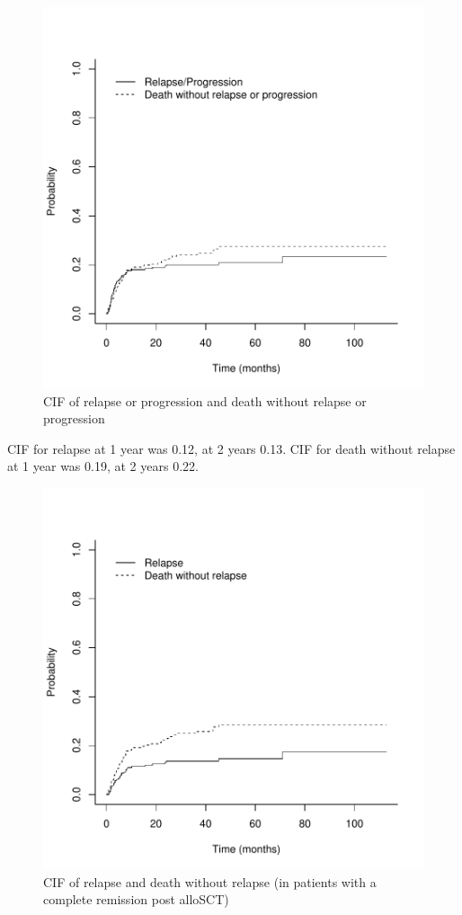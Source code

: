 \documentclass[a4paper,11pt] {article}
\begin{document}
\begin{figure}[h]
\begin{center}
\includegraphics{Rapport-fig6}
\end{center}
\caption{CIF of relapse or progression and death without relapse or progression}
\label{fig6}
\end{figure}

\pagebreak
CIF for relapse at 1 year was 0.12, at 2 years  0.13. CIF for death without relapse  at 1 year was 0.19, at 2 years  0.22. 
\begin{figure}[h]
\begin{center}
\includegraphics{Rapport-fig7}
\end{center}
\caption{CIF of relapse and death without relapse (in patients with a complete remission post alloSCT)}
\label{fig7}
\end{figure}
\end{document}
